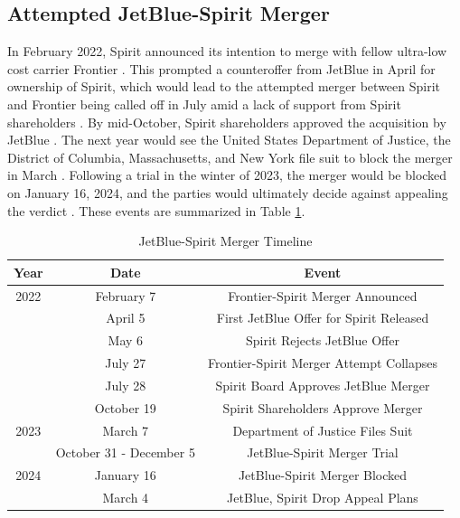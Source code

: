 \documentclass{article}
\begin{document}
	\subsection{Attempted JetBlue-Spirit Merger}
	\label{sec:Setting_Merger}
	In February 2022, Spirit announced its intention to merge with fellow ultra-low cost carrier Frontier \citep{schaper_frontier-spirit_2022}. This prompted a counteroffer from JetBlue in April for ownership of Spirit, which would lead to the attempted merger between Spirit and Frontier being called off in July amid a lack of support from Spirit shareholders \citep{josephs_jetblue_2022, josephs_spirit_2022}. By mid-October, Spirit shareholders approved the acquisition by JetBlue \citep{koenig_spirit_2022}. The next year would see the United States Department of Justice, the District of Columbia, Massachusetts, and New York file suit to block the merger in March \citep{chokshi_justice_2023}. Following a trial in the winter of 2023, the merger would be blocked on January 16, 2024, and the parties would ultimately decide against appealing the verdict \citep{chapman_jetblue_2024}.  These events are summarized in Table \ref{tab:JetBlue_Spirit_Timeline}. 

    	\begin{table}[tb]
		\caption{JetBlue-Spirit Merger Timeline}
		\label{tab:JetBlue_Spirit_Timeline}
		\begin{center}
			\begin{tabular}{ccc}
				\hline
				Year & Date & Event \\
				\hline
				2022 & February 7 & Frontier-Spirit Merger Announced \\
				& April 5 &  First JetBlue Offer for Spirit Released\\
				& May 6 & Spirit Rejects JetBlue Offer \\
				& July 27 &  Frontier-Spirit Merger Attempt Collapses\\
				& July 28 &  Spirit Board Approves JetBlue Merger\\
				& October 19 & Spirit Shareholders Approve Merger \\
				\hline
				2023 & March 7 &  Department of Justice Files Suit\\
				& October 31 - December 5 &  JetBlue-Spirit Merger Trial \\
				\hline
				2024 & January 16 & JetBlue-Spirit Merger Blocked \\
				& March 4 & JetBlue, Spirit Drop Appeal Plans \\
			\end{tabular}
		\end{center}
	\end{table}
\end{document}

